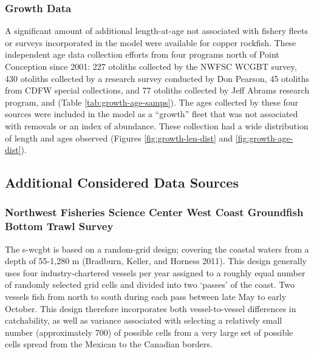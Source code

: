 \documentclass[11pt,
  english,
  letterpaper,
]{article}
\begin{document}
\hypertarget{growth-data}{%
\subsubsection{Growth Data}\label{growth-data}}

A significant amount of additional length-at-age not associated with fishery fleets or surveys incorporated in the model were available for copper rockfish. These independent age data collection efforts from four programs north of Point Conception since 2001: 227 otoliths collected by the NWFSC WCGBT survey, 430 otoliths collected by a research survey conducted by Don Pearson, 45 otoliths from CDFW special collections, and 77 otoliths collected by Jeff Abrams research program, and (Table \ref{tab:growth-age-samps}). The ages collected by these four sources were included in the model as a ``growth'' fleet that was not associated with removals or an index of abundance. These collection had a wide distribution of length and ages observed (Figures \ref{fig:growth-len-dist} and \ref{fig:growth-age-dist}).

\hypertarget{additional-considered-data-sources}{%
\subsection{Additional Considered Data Sources}\label{additional-considered-data-sources}}

\hypertarget{northwest-fisheries-science-center-west-coast-groundfish-bottom-trawl-survey}{%
\subsubsection{Northwest Fisheries Science Center West Coast Groundfish Bottom Trawl Survey}\label{northwest-fisheries-science-center-west-coast-groundfish-bottom-trawl-survey}}

The \Gls{s-wcgbt} is based on a random-grid design; covering the coastal waters from a depth of 55-1,280 m (Bradburn, Keller, and Horness 2011). This design generally uses four industry-chartered vessels per year assigned to a roughly equal number of randomly selected grid cells and divided into two `passes' of the coast. Two vessels fish from north to south during each pass between late May to early October. This design therefore incorporates both vessel-to-vessel differences in catchability, as well as variance associated with selecting a relatively small number (approximately 700) of possible cells from a very large set of possible cells spread from the Mexican to the Canadian borders.
\end{document}

